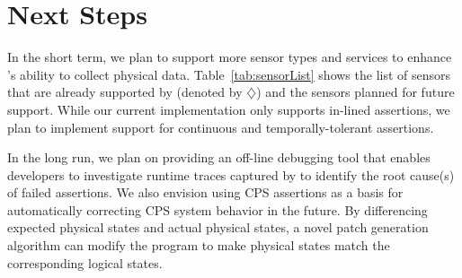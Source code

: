 \section{Next Steps} \label{sec:next}

In the short term, we plan to support more sensor types and services to enhance \FrameworkName's ability to collect physical data.  Table~\ref{tab:sensorList} shows the list of sensors that are already supported by \FrameworkName (denoted by $\diamondsuit$) and the sensors planned for future support.
While our current implementation only supports in-lined assertions, we plan to implement support for continuous and temporally-tolerant assertions. %

In the long run, we plan on providing an off-line debugging tool that enables developers to investigate runtime traces captured by \FrameworkName to identify the root cause(s) of failed assertions. 
We also envision using CPS assertions as a basis for automatically correcting CPS system behavior in the future. By differencing expected physical states and actual physical states, a novel patch generation algorithm can modify the program to make physical states match the corresponding logical states. 


